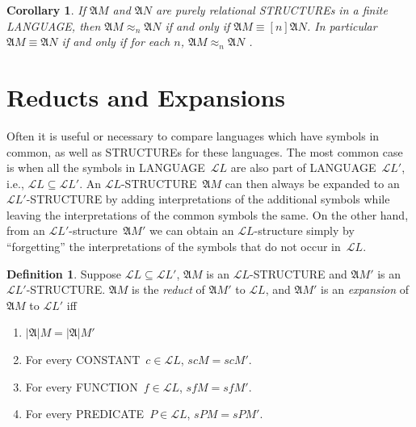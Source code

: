 \documentclass[10pt,a4paper]{article}
\newcommand*{\olup}[1]{\MakeUppercase{#1}}
\theoremstyle{plain}
\newtheorem{cor}[thm]{Corollary}
\theoremstyle{definition}
\newtheorem{defn}[thm]{Definition}
\theoremstyle{remark}
\newcommand*{\olfileid}[3]{}
\newcommand*{\ollabel}[1]{\label{#1}}
\providecommand{\Struct}{\ensuremath{\mathfrak{A}}}
\providecommand{\Domain}{\ensuremath{|\mathfrak{A}|}}
\providecommand{\Assign}{\ensuremath{s}}
\providecommand{\Lang}{\ensuremath{\mathcal{L}}}
\providecommand{\elemequiv}{\mathrel{\equiv}}
\begin{document}
\begin{cor}\ollabel{cor:b-n-f}
  If $\Struct{M}$ and $\Struct{N}$ are purely relational \olup{structure}s
  in a finite \olup{language}, then $\Struct{M} \approx_n\Struct{N}$ if and
  only if $\Struct{M} \elemequiv[n] \Struct{N}$. In particular
  $\Struct{M} \elemequiv \Struct{N}$ if and only if for each $n$,
  $\Struct{M} \approx_n \Struct{N}$ .
\end{cor}





\olfileid{mod}{bas}{red}
\section{Reducts and Expansions}

Often it is useful or necessary to compare languages which have
symbols in common, as well as \olup{structure}s for these languages.  The
most common case is when all the symbols in \olup{language}~$\Lang{L}$
are also part of \olup{language}~$\Lang{L'}$, i.e., $\Lang{L} \subseteq
\Lang{L'}$. An $\Lang{L}$-\olup{structure}~$\Struct{M}$ can then always
be expanded to an $\Lang{L'}$-\olup{structure} by adding interpretations
of the additional symbols while leaving the interpretations of the
common symbols the same.  On the other hand, from an
$\Lang{L'}$-structure~$\Struct{M'}$ we can obtain an
$\Lang{L}$-structure simply by ``forgetting'' the interpretations of
the symbols that do not occur in~$\Lang{L}$.

\begin{defn}
\ollabel{defn:reduct}
Suppose $\Lang L \subseteq \Lang L'$, $\Struct M$ is an
$\Lang L$-\olup{structure} and $\Struct M'$ is an $\Lang L'$-\olup{structure}.
$\Struct M$ is the \emph{reduct} of $\Struct M'$ to $\Lang L$, and
$\Struct M'$ is an \emph{expansion} of $\Struct M$ to $\Lang L'$ iff
\begin{enumerate}
\item $\Domain{M} = \Domain{M'}$
\item For every \olup{constant}~$c \in \Lang L$, $\Assign{c}{M} =
  \Assign{c}{M'}$.
\item For every \olup{function}~$f \in \Lang L$, $\Assign{f}{M} =
  \Assign{f}{M'}$.
\item For every \olup{predicate}~$P \in \Lang L$, $\Assign{P}{M} =
  \Assign{P}{M'}$.
\end{enumerate}
\end{defn}
\end{document}
